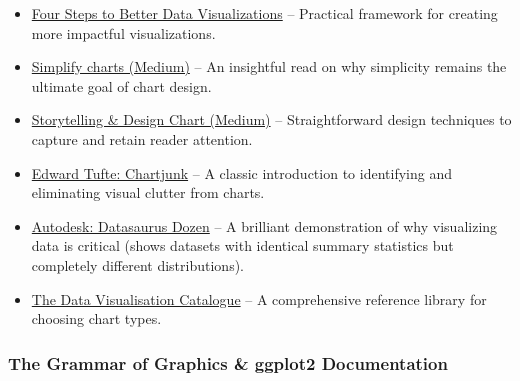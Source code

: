 \documentclass[
]{article}
\providecommand{\tightlist}{%
  \setlength{\itemsep}{0pt}\setlength{\parskip}{0pt}}
\begin{document}
\begin{itemize}
\tightlist
\item
  \href{https://www.centerforengagedlearning.org/four-steps-to-better-data-visualizations/}{Four
  Steps to Better Data Visualizations} -- Practical framework for
  creating more impactful visualizations.
\item
  \href{https://medium.com/counterarts/simplicity-is-a-data-visualization-best-friend-4ad4fbec30da}{Simplify
  charts (Medium)} -- An insightful read on why simplicity remains the
  ultimate goal of chart design.
\item
  \href{https://gawarska-tywonek.medium.com/storytelling-a-simple-trick-to-grab-the-user-attention-8b89655e239c}{Storytelling
  \& Design Chart (Medium)} -- Straightforward design techniques to
  capture and retain reader attention.
\item
  \href{https://www.edwardtufte.com/bboard/q-and-a-fetch-msg?msg_id=00040Z}{Edward
  Tufte: Chartjunk} -- A classic introduction to identifying and
  eliminating visual clutter from charts.
\item
  \href{https://www.autodesk.com/research/publications/same-stats-different-graphs}{Autodesk:
  Datasaurus Dozen} -- A brilliant demonstration of why visualizing data
  is critical (shows datasets with identical summary statistics but
  completely different distributions).
\item
  \href{https://datavizcatalogue.com/}{The Data Visualisation Catalogue}
  -- A comprehensive reference library for choosing chart types.
\end{itemize}

\subsubsection{The Grammar of Graphics \& ggplot2
Documentation}\label{the-grammar-of-graphics-ggplot2-documentation}
\end{document}
